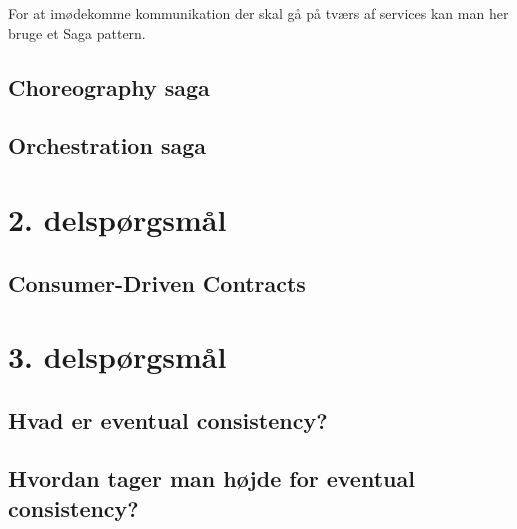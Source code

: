 \documentclass[12pt]{article} %
\begin{document}
\noindent
For at imødekomme kommunikation der skal gå på tværs af services kan man her bruge et Saga pattern.


\cite{richardson2019microservices}

\subsection{ Choreography saga }
\subsection { Orchestration saga }
\section { 2. delspørgsmål }
\subsection { Consumer-Driven Contracts }
\section { 3. delspørgsmål }
\subsection { Hvad er eventual consistency? }
\subsection { Hvordan tager man højde for eventual consistency? }


\newpage


\end{document}
